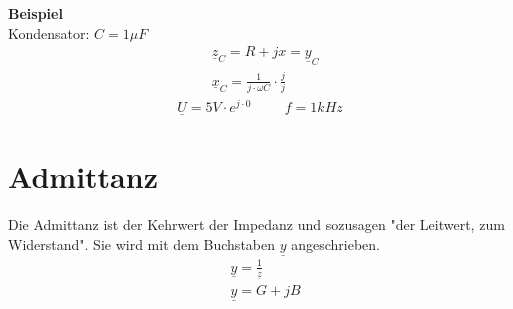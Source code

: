 \textbf{Beispiel} \\
Kondensator: $C=1\mu F$\\
\begin{align}
    &\underline{z}_C=R+jx=\underline{y}_C                       \\
    &\underline{x}_C=\frac{1}{j\cdot\omega C}\cdot\frac{j}{j}
\end{align}
\begin{align}
    \underline{U}=5V\cdot e^{j\cdot 0} \hspace{1cm} f=1kHz
\end{align}

\section{Admittanz}
Die Admittanz ist der Kehrwert der Impedanz und sozusagen "der Leitwert, zum Widerstand". Sie wird mit dem Buchstaben $\underline{y}$ angeschrieben.
\begin{align}
    &\underline{y}=\frac{1}{\underline{z}}  \\
    &\underline{y}=G+jB
\end{align}